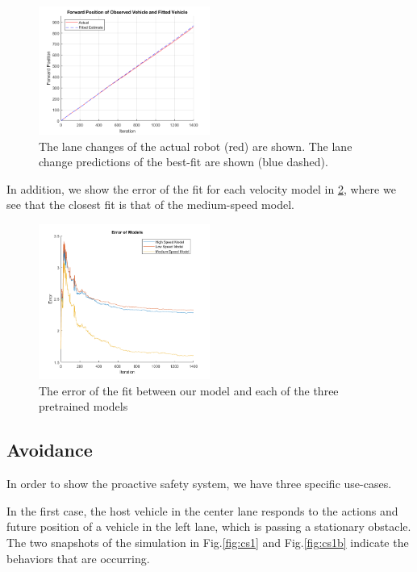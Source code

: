 \documentclass[letterpaper, 10 pt, conference]{ieeeconf}  %
\begin{document}
\begin{figure}[ht]
    \includegraphics[width=0.5\textwidth]{fit1.png}
    \caption{The lane changes of the actual robot (red) are shown. The lane change predictions of the best-fit are shown (blue dashed).}
    \label{fig:lanchan}
\end{figure}
 In addition, we show the error of the fit for each velocity model in \ref{fig:error}, where we see that the closest fit is that of the medium-speed model.
 
 \begin{figure}[ht]
    \includegraphics[width=0.5\textwidth]{fit3.png}
    \caption{The error of the fit between our model and each of the three pretrained models}
    \label{fig:error}
\end{figure}
 
 
\subsection{Avoidance}
In order to show the proactive safety system, we have three specific use-cases.

In the first case, the host vehicle in the center lane responds to the actions and future position of a vehicle in the left lane, which is passing a stationary obstacle. The two snapshots of the simulation in Fig.\ref{fig:cs1} and Fig.\ref{fig:cs1b} indicate the behaviors that are occurring.
\end{document}

